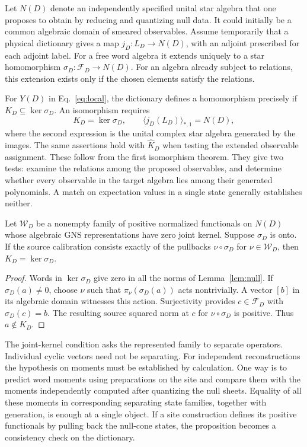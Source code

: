 \documentclass[11pt,letterpaper]{article}
\newcommand{\F}{\mathcal F}
\newcommand{\sat}{\widehat K}
\begin{document}
Let $N(D)$ denote an independently specified unital star algebra that one proposes to obtain by reducing and quantizing null data. It could initially be a common algebraic domain of smeared observables. Assume temporarily that a physical dictionary gives a map $j_D:L_D\to N(D)$, with an adjoint prescribed for each adjoint label. For a free word algebra it extends uniquely to a star homomorphism $\sigma_D:\F_D\to N(D)$. For an algebra already subject to relations, this extension exists only if the chosen elements satisfy the relations.

For $Y(D)$ in Eq.~\eqref{eq:local}, the dictionary defines a homomorphism precisely if $K_D\subseteq\ker\sigma_D$. An isomorphism requires
\begin{equation}
 K_D=\ker\sigma_D,\qquad
 \langle j_D(L_D)\rangle_{*,1}=N(D),                    \label{eq:obj}
\end{equation}
where the second expression is the unital complex star algebra generated by the images. The same assertions hold with $\sat_D$ when testing the extended observable assignment. These follow from the first isomorphism theorem. They give two tests: examine the relations among the proposed observables, and determine whether every observable in the target algebra lies among their generated polynomials. A match on expectation values in a single state generally establishes neither.

\begin{proposition}\label{prop:moments}
Let $\mathcal W_D$ be a nonempty family of positive normalized functionals on $N(D)$ whose algebraic GNS representations have zero joint kernel. Suppose $\sigma_D$ is onto. If the source calibration consists exactly of the pullbacks $\nu\circ\sigma_D$ for $\nu\in\mathcal W_D$, then $K_D=\ker\sigma_D$.
\end{proposition}
\begin{proof}
Words in $\ker\sigma_D$ give zero in all the norms of Lemma~\ref{lem:null}. If $\sigma_D(a)\ne0$, choose $\nu$ such that $\pi_\nu(\sigma_D(a))$ acts nontrivially. A vector $[b]$ in its algebraic domain witnesses this action. Surjectivity provides $c\in\F_D$ with $\sigma_D(c)=b$. The resulting source squared norm at $c$ for $\nu\circ\sigma_D$ is positive. Thus $a\notin K_D$.
\end{proof}

The joint-kernel condition asks the represented family to separate operators. Individual cyclic vectors need not be separating. For independent reconstructions the hypothesis on moments must be established by calculation. One way is to predict word moments using preparations on the site and compare them with the moments independently computed after quantizing the null sheets. Equality of all these moments in corresponding separating state families, together with generation, is enough at a single object. If a site construction defines its positive functionals by pulling back the null-cone states, the proposition becomes a consistency check on the dictionary.
\end{document}
